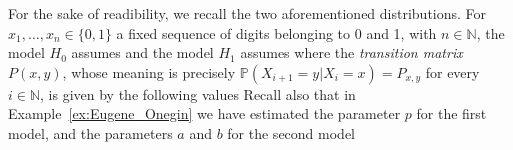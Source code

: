 	For the sake of readibility, we recall the two aforementioned distributions. For $x_1, \ldots, x_n \in\{0,1\}$ a fixed sequence of digits belonging to 0 and 1, with $n \in \mathbb N$, the model $H_0$ assumes   
	and the model $H_1$ assumes 
	where the \emph{transition matrix} $P(x, y)$, whose meaning is precisely $\mathbb P(X_{i + 1}= y | X_i = x ) = P_{x,y}$ for every $i \in\mathbb N$, is given by the following values 
	Recall also that in Example~\ref{ex:Eugene_Onegin} we have estimated the parameter $p$ for the first model, and the parameters $a$ and $b$ for the second model
